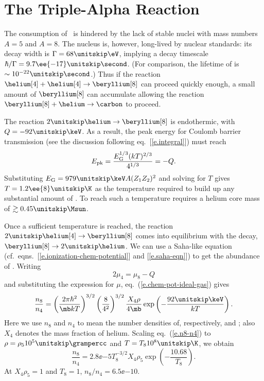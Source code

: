 
\section{The Triple-Alpha Reaction}\label{s.triple-alpha}

The consumption of \helium\ is hindered by the lack of stable nuclei with mass numbers $A=5$ and $A=8$.  
The nucleus \beryllium[8] is, however, long-lived by nuclear standards: its decay width is $\Gamma = 68\nsp\eV$, implying a decay timescale $\hbar/\Gamma = 9.7\ee{-17}\nsp\second$.  (For comparison, the lifetime of \lithium[5] is $\sim 10^{-22}\nsp\second$.)  Thus if the reaction $\helium[4]+\helium[4]\to\beryllium[8]$ can proceed quickly enough, a small amount of $\beryllium[8]$ can accumulate allowing the reaction $\beryllium[8]+\helium\to\carbon$ to proceed.

The reaction $2\nsp\helium\to\beryllium[8]$ is endothermic, with $Q = -92\nsp\keV$.  As a result, the peak energy for Coulomb barrier transmission (see the discussion following eq.~[\ref{e.integral}]) must reach
\[ E_{\mathrm{pk}} = \frac{E_{\mathrm{G}}^{1/3}(kT)^{2/3}}{4^{1/3}} = -Q. \]
Substituting $\EG = 979\nsp\keV A (Z_{1}Z_{2})^{2}$ and solving for $T$ gives $T = 1.2\ee{8}\nsp\K$ as the temperature required to build up any substantial amount of \beryllium[8].  To reach such a temperature requires a helium core mass of $\gtrsim 0.45\nsp\Msun$.

Once a sufficient temperature is reached, the reaction $2\nsp\helium[4]\to\beryllium[8]$ comes into equilibrium with the decay, $\beryllium[8]\to2\nsp\helium$.  We can use a Saha-like equation (cf.\ eqns.~[\ref{e.ionization-chem-potential}] and [\ref{e.saha-eqn}]) to get the abundance of \beryllium[8].  Writing
\[ 2\mu_{4} = \mu_{8} - Q \]
and substituting the expression for $\mu$, eq.~(\ref{e.chem-pot-ideal-gas}) gives
\begin{equation}\label{e.n8-n4}
\frac{n_{8}}{n_{4}} = \left(\frac{2\pi\hbar^{2}}{\mb kT}\right)^{3/2}\left(\frac{8}{4^{2}}\right)^{3/2}\frac{X_{4}\rho}{4\mb}\exp\left(-\frac{92\nsp\keV}{kT}\right).
\end{equation}
Here we use $n_{8}$ and $n_{4}$ to mean the number densities of, respectively, \beryllium[8] and \helium; also $X_{4}$ denotes the mass fraction of helium.
Scaling eq.~(\ref{e.n8-n4}) to $\rho = \rho_{5} 10^{5}\nsp\grampercc$ and $T = T_{8}10^{8}\nsp\K$, we obtain
\begin{equation}\label{e.n8-to-n4}
 \frac{n_{8}}{n_{4}} = 2.8\ee{-5} T_{8}^{-3/2}X_{4}\rho_{5}\exp\left(-\frac{10.68}{T_{8}}\right).
\end{equation}
At $X_{4}\rho_{5}=1$ and $T_{8} = 1$, $n_{8}/n_{4} = 6.5\ee{-10}$.  

